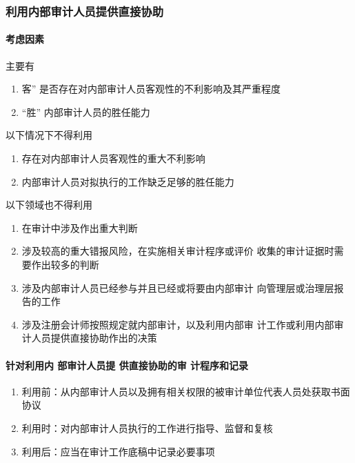 \documentclass[UTF8,12pt]{ctexart}
\numberwithin{equation}{section} %
\numberwithin{figure}{section}
\numberwithin{table}{section}
\begin{document}
	
	
	\subsubsection{利用内部审计人员提供直接协助}
	
	\paragraph{考虑因素}
	主要有
	\begin{enumerate}
		\item 客” 是否存在对内部审计人员客观性的不利影响及其严重程度 
		
		\item “胜” 内部审计人员的胜任能力
	\end{enumerate}
	
	以下情况下不得利用
	\begin{enumerate}
		\item 存在对内部审计人员客观性的重大不利影响    
		
		\item 内部审计人员对拟执行的工作缺乏足够的胜任能力
	\end{enumerate}
	
	以下领域也不得利用
	\begin{enumerate}
		\item 在审计中涉及作出重大判断
		
		\item 涉及较高的重大错报风险，在实施相关审计程序或评价 收集的审计证据时需要作出较多的判断
		
		\item 涉及内部审计人员已经参与并且已经或将要由内部审计 向管理层或治理层报告的工作
		
		\item 涉及注册会计师按照规定就内部审计，以及利用内部审 计工作或利用内部审计人员提供直接协助作出的决策
	\end{enumerate}
	
	\paragraph{针对利用内 部审计人员提 供直接协助的审 计程序和记录}
	\begin{enumerate}
		\item 利用前：从内部审计人员以及拥有相关权限的被审计单位代表人员处获取书面协议
		
		\item 利用时：对内部审计人员执行的工作进行指导、监督和复核
		
		\item 利用后：应当在审计工作底稿中记录必要事项
	\end{enumerate}
	
\end{document}
